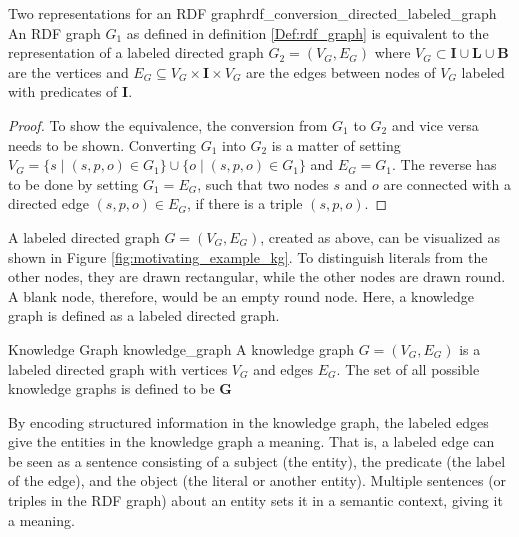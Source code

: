 \begin{Satz}{Two representations for an RDF graph}{rdf_conversion_directed_labeled_graph}
An RDF graph $G_1$ as defined in definition \ref{Def:rdf_graph} is equivalent to the representation of a labeled directed graph $G_2 = (V_G,E_G)$ where $V_G \subset \mathbf{I} \cup \mathbf{L} \cup \mathbf{B}$ are the vertices and $E_G \subseteq V_G \times \mathbf{I} \times V_G$ are the edges between nodes of $V_G$ labeled with predicates of $\mathbf{I}$.
\end{Satz}
\begin{proof}
To show the equivalence, the conversion from $G_1$ to $G_2$ and vice versa needs to be shown.
Converting $G_1$ into $G_2$ is a matter of setting $V_G = \{s \mid (s,p,o) \in G_1\} \cup \{o \mid (s,p,o) \in G_1\}$ and $E_G = G_1$. The reverse has to be done by setting $G_1 = E_G$, such that two nodes $s$ and $o$ are connected with a directed edge $(s,p,o) \in E_G$, if there is a triple $(s,p,o)$.
\end{proof}

A labeled directed graph $G = (V_G, E_G)$, created as above, can be visualized as shown in Figure \ref{fig:motivating_example_kg}. To distinguish literals from the other nodes, they are drawn rectangular, while the other nodes are drawn round. A blank node, therefore, would be an empty round node. Here, a knowledge graph is defined as a labeled directed graph.

\begin{Def}{Knowledge Graph \cite{corman2019validating}}{knowledge_graph}
A knowledge graph $G = (V_G,E_G)$ is a labeled directed graph with vertices $V_G$ and edges $E_G$. The set of all possible knowledge graphs is defined to be $\mathbf{G}$
\end{Def}

By encoding structured information in the knowledge graph, the labeled edges give the entities in the knowledge graph a meaning. That is, a labeled edge can be seen as a sentence consisting of a subject (the entity), the predicate (the label of the edge), and the object (the literal or another entity). Multiple sentences (or triples in the RDF graph) about an entity sets it in a semantic context, giving it a meaning.
